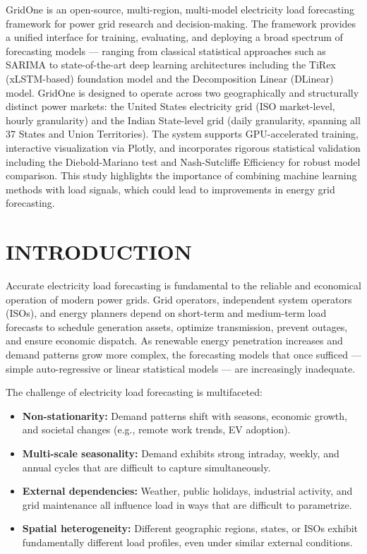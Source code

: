\documentclass[ 12pt,a4paper,twocolumn,fleqn]{report}
\begin{document}
GridOne is an open-source, multi-region, multi-model electricity load forecasting framework for power grid research and decision-making. The framework provides a unified interface for training, evaluating, and deploying a broad spectrum of forecasting models — ranging from classical statistical approaches such as SARIMA to state-of-the-art deep learning architectures including the TiRex (xLSTM-based) foundation model and the Decomposition Linear (DLinear) model. GridOne is designed to operate across two geographically and structurally distinct power markets: the United States electricity grid (ISO market-level, hourly granularity) and the Indian State-level grid (daily granularity, spanning all 37 States and Union Territories). The system supports GPU-accelerated training, interactive visualization via Plotly, and incorporates rigorous statistical validation including the Diebold-Mariano test and Nash-Sutcliffe Efficiency for robust model comparison. This study highlights the importance of combining machine learning methods with load signals, which could lead to improvements in energy grid forecasting.

\newpage
    \pagestyle{combined}
\thisfancypage{%
  \setlength{\fboxsep}{20pt}\doublebox}{}
\chapter{INTRODUCTION}
Accurate electricity load forecasting is fundamental to the reliable and economical operation of modern power grids. Grid operators, independent system operators (ISOs), and energy planners depend on short-term and medium-term load forecasts to schedule generation assets, optimize transmission, prevent outages, and ensure economic dispatch. As renewable energy penetration increases and demand patterns grow more complex, the forecasting models that once sufficed — simple auto-regressive or linear statistical models — are increasingly inadequate.

The challenge of electricity load forecasting is multifaceted:
\begin{itemize}
    \item \textbf{Non-stationarity:} Demand patterns shift with seasons, economic growth, and societal changes (e.g., remote work trends, EV adoption).
    \item \textbf{Multi-scale seasonality:} Demand exhibits strong intraday, weekly, and annual cycles that are difficult to capture simultaneously.
    \item \textbf{External dependencies:} Weather, public holidays, industrial activity, and grid maintenance all influence load in ways that are difficult to parametrize.
    \item \textbf{Spatial heterogeneity:} Different geographic regions, states, or ISOs exhibit fundamentally different load profiles, even under similar external conditions.
\end{itemize}
\end{document}
